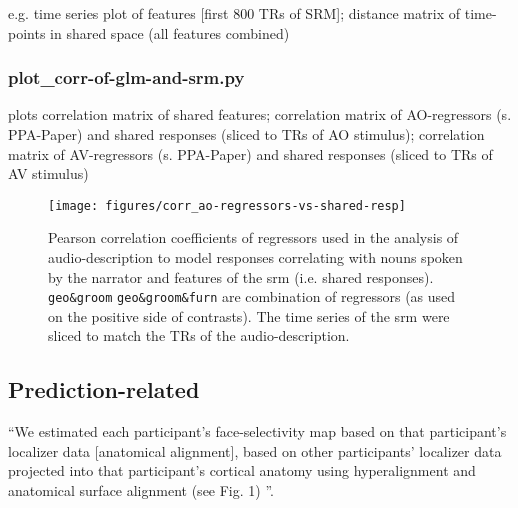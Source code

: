 
e.g. time series plot of features [first 800 TRs of SRM]; distance matrix of
time-points in shared space (all features combined)


\subsubsection{plot\_corr-of-glm-and-srm.py}


plots correlation matrix of shared features; correlation matrix of
AO-regressors (s. PPA-Paper) and shared responses (sliced to TRs of AO
stimulus); correlation matrix of AV-regressors (s. PPA-Paper) and shared
responses (sliced to TRs of AV stimulus)




\begin{figure*}[tbp]
\centering
    \texttt{[image: figures/corr\_ao-regressors-vs-shared-resp]}
    \caption{Pearson correlation coefficients of regressors used in the analysis
    of audio-description to model responses correlating with nouns spoken by the
    narrator and features of the \ac{srm} (i.e. shared responses).
    \texttt{geo\&groom} \texttt{geo\&groom\&furn} are combination of regressors
    (as used on the positive side of contrasts). The
    time series of the \ac{srm} were sliced to match the TRs of the
    audio-description.
      }
\label{fig:reg-corr}
\end{figure*}


\subsection{Prediction-related}


``We estimated each participant's face-selectivity map based on that
participant’s localizer data [anatomical alignment], based on other
participants' localizer data projected into that participant's cortical anatomy
using hyperalignment and anatomical surface alignment (see Fig. 1)
\citep{jiahui2020predicting}''.

